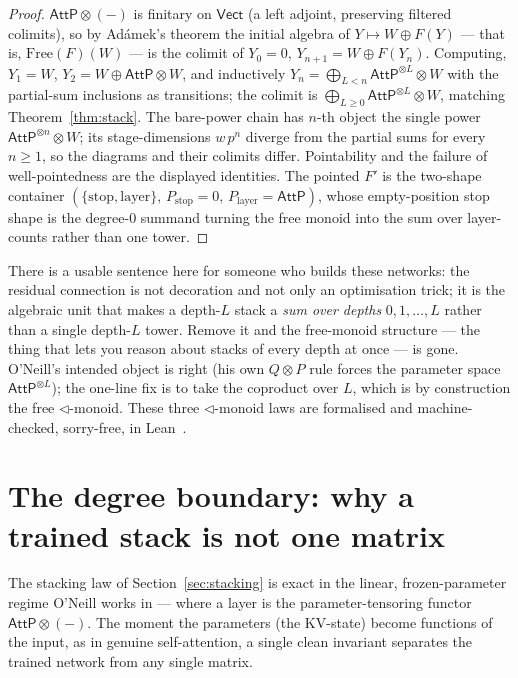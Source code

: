 \documentclass[11pt]{article}
\newcommand{\Vect}{\mathsf{Vect}}
\newcommand{\AttP}{\mathsf{AttP}}
\theoremstyle{plain}
\theoremstyle{definition}
\begin{document}
\begin{proof}
$\AttP\otimes(-)$ is finitary on $\Vect$ (a left adjoint, preserving filtered colimits), so by Adámek's
theorem the initial algebra of $Y\mapsto W\oplus F(Y)$ --- that is, $\mathrm{Free}(F)(W)$ --- is the colimit
of $Y_{0}=0$, $Y_{n+1}=W\oplus F(Y_{n})$. Computing, $Y_{1}=W$, $Y_{2}=W\oplus\AttP\otimes W$, and inductively
$Y_{n}=\bigoplus_{L<n}\AttP^{\otimes L}\otimes W$ with the partial-sum inclusions as transitions; the colimit
is $\bigoplus_{L\ge 0}\AttP^{\otimes L}\otimes W$, matching Theorem~\ref{thm:stack}. The bare-power chain has
$n$-th object the single power $\AttP^{\otimes n}\otimes W$; its stage-dimensions $w\,p^{n}$ diverge from the
partial sums for every $n\ge 1$, so the diagrams and their colimits differ. Pointability and the failure of
well-pointedness are the displayed identities. The pointed $F'$ is the two-shape container
$(\{\text{stop},\text{layer}\},\,P_{\text{stop}}=0,\,P_{\text{layer}}=\AttP)$, whose empty-position stop shape
is the degree-$0$ summand turning the free monoid into the sum over layer-counts rather than one tower.
\end{proof}

There is a usable sentence here for someone who builds these networks: the residual connection is not
decoration and not only an optimisation trick; it is the algebraic unit that makes a depth-$L$ stack a
\emph{sum over depths} $0,1,\dots,L$ rather than a single depth-$L$ tower. Remove it and the free-monoid
structure --- the thing that lets you reason about stacks of every depth at once --- is gone. O'Neill's
intended object is right (his own $Q\otimes P$ rule forces the parameter space $\AttP^{\otimes L}$); the
one-line fix is to take the coproduct over $L$, which is by construction the free $\lhd$-monoid. These
three $\lhd$-monoid laws are formalised and machine-checked, sorry-free, in Lean~\cite{leanfree}.

\section{The degree boundary: why a trained stack is not one matrix}\label{sec:degree}

The stacking law of Section~\ref{sec:stacking} is exact in the linear, frozen-parameter regime O'Neill works
in --- where a layer is the parameter-tensoring functor $\AttP\otimes(-)$. The moment the parameters (the
KV-state) become functions of the input, as in genuine self-attention, a single clean invariant separates the
trained network from any single matrix.
\end{document}
